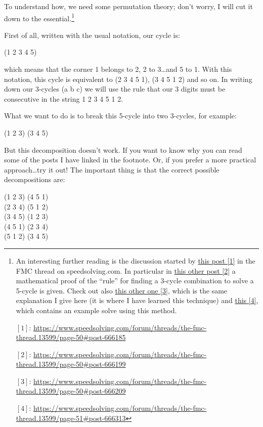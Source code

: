 \documentclass[11pt,a4paper]{book}
\begin{document}
To understand how, we need some permutation theory; don't worry, I will cut it down to the essential.\footnote{An interesting further reading is the discussion started by \href{{https://www.speedsolving.com/forum/threads/the-fmc-thread.13599/page-50\#post-666185}}{this post [1]} in the FMC thread on speedsolving.com. In particular in \href{https://www.speedsolving.com/forum/threads/the-fmc-thread.13599/page-50\#post-666199}{this other post [2]} a mathematical proof of the ``rule'' for finding a 3-cycle combination to solve a 5-cycle is given. Check out also \href{https://www.speedsolving.com/forum/threads/the-fmc-thread.13599/page-50\#post-666209}{this other one [3]}, which is the same explanation I give here (it is where I have learned this technique) and \href{https://www.speedsolving.com/forum/threads/the-fmc-thread.13599/page-51\#post-666313}{this [4]}, which contains an example solve using this method.

$[1]$: \url{https://www.speedsolving.com/forum/threads/the-fmc-thread.13599/page-50\#post-666185}

$[2]$: \url{https://www.speedsolving.com/forum/threads/the-fmc-thread.13599/page-50\#post-666199}

$[3]$: \url{https://www.speedsolving.com/forum/threads/the-fmc-thread.13599/page-50\#post-666209}

$[4]$: \url{https://www.speedsolving.com/forum/threads/the-fmc-thread.13599/page-51\#post-666313}}

First of all, written with the usual notation, our cycle is:
\begin{center}
(1 2 3 4 5)
\end{center}
which means that the corner 1 belongs to 2, 2 to 3\dots and 5 to 1. With this notation, this cycle is equivalent to (2 3 4 5 1), (3 4 5 1 2) and so on. In writing down our 3-cycles (a b c) we will use the rule that our 3 digits must be consecutive in the string 1 2 3 4 5 1 2.

What we want to do is to break this 5-cycle into two 3-cycles, for example:
\begin{center}
(1 2 3) (3 4 5)
\end{center}
But this decomposition doesn't work. If you want to know why you can read some of the posts I have linked in the footnote. Or, if you prefer a more practical approach\dots try it out! The important thing is that the correct possible decompositions are:

\begin{center}
(1 2 3) (4 5 1)\\
(2 3 4) (5 1 2)\\
(3 4 5) (1 2 3)\\
(4 5 1) (2 3 4)\\
(5 1 2) (3 4 5)\\
\end{center}
\end{document}
